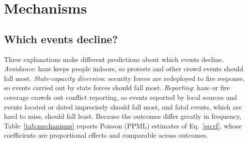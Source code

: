 \documentclass[12pt]{article}
\begin{document}
\section{Mechanisms}
\label{sec:mechanisms}

\subsection{Which events decline?}

Three explanations make different predictions about which events decline. \emph{Avoidance}: haze keeps people indoors, so protests and other crowd events should fall most. \emph{State-capacity diversion}: security forces are redeployed to fire response, so events carried out by state forces should fall most. \emph{Reporting}: haze or fire coverage crowds out conflict reporting, so events reported by local sources and events located or dated imprecisely should fall most, and fatal events, which are hard to miss, should fall least. Because the outcomes differ greatly in frequency, Table~\ref{tab:mechanisms} reports Poisson (PPML) estimates of Eq.~\eqref{eq:rf}, whose coefficients are proportional effects and comparable across outcomes.
\end{document}
